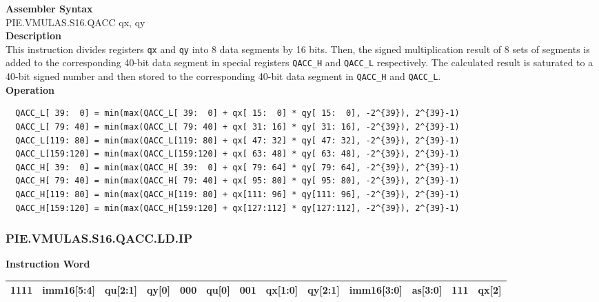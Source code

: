 \textbf{Assembler Syntax} \\
PIE.VMULAS.S16.QACC qx, qy \\
\textbf{Description} \\
This instruction divides registers \lstinline{qx} and \lstinline{qy} into 8 data segments by 16 bits. Then, the signed multiplication result of 8 sets of segments is added to the corresponding 40-bit data segment in special registers \lstinline{QACC_H} and \lstinline{QACC_L} respectively. The calculated result is saturated to a 40-bit signed number and then stored to the corresponding 40-bit data segment in \lstinline{QACC_H} and \lstinline{QACC_L}.\\
\textbf{Operation}
\begin{lstlisting}
  QACC_L[ 39:  0] = min(max(QACC_L[ 39:  0] + qx[ 15:  0] * qy[ 15:  0], -2^{39}), 2^{39}-1)
  QACC_L[ 79: 40] = min(max(QACC_L[ 79: 40] + qx[ 31: 16] * qy[ 31: 16], -2^{39}), 2^{39}-1)
  QACC_L[119: 80] = min(max(QACC_L[119: 80] + qx[ 47: 32] * qy[ 47: 32], -2^{39}), 2^{39}-1)
  QACC_L[159:120] = min(max(QACC_L[159:120] + qx[ 63: 48] * qy[ 63: 48], -2^{39}), 2^{39}-1)
  QACC_H[ 39:  0] = min(max(QACC_H[ 39:  0] + qx[ 79: 64] * qy[ 79: 64], -2^{39}), 2^{39}-1)
  QACC_H[ 79: 40] = min(max(QACC_H[ 79: 40] + qx[ 95: 80] * qy[ 95: 80], -2^{39}), 2^{39}-1)
  QACC_H[119: 80] = min(max(QACC_H[119: 80] + qx[111: 96] * qy[111: 96], -2^{39}), 2^{39}-1)
  QACC_H[159:120] = min(max(QACC_H[159:120] + qx[127:112] * qy[127:112], -2^{39}), 2^{39}-1)
\end{lstlisting}

\newpage
\subsubsection{PIE.VMULAS.S16.QACC.LD.IP}\label{instruction:PIEVMULASS16QACCLDIP}
\setlength\tabcolsep{6pt}
\textbf{Instruction Word} \\
\begin{tabular}{|c|c|c|c|c|c|c|c|c|c|c|c|c|}
	\hline
	1111 & imm16[5:4] & qu[2:1] & qy[0] & 000 & qu[0] & 001 & qx[1:0] & qy[2:1] & imm16[3:0] & as[3:0] & 111 & qx[2] \\
	\hline
\end{tabular}

